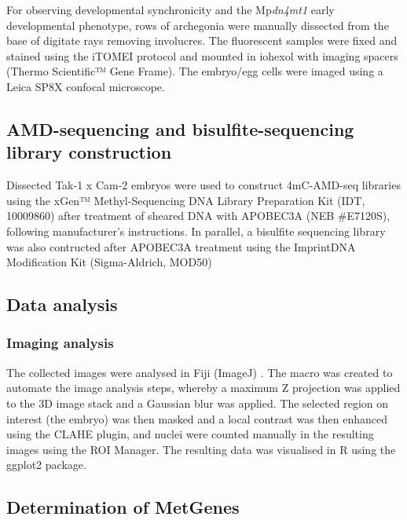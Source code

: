 For observing developmental synchronicity and the Mp\textit{dn4mt1} early developmental phenotype,  rows of archegonia were manually dissected from the base of digitate rays removing involucres. The fluorescent samples were fixed and stained using the iTOMEI protocol \citep{RN148} and mounted in iohexol with imaging spacers (Thermo Scientific™ Gene Frame). The embryo/egg cells were imaged using a Leica SP8X confocal microscope.

\subsection{AMD-sequencing and bisulfite-sequencing library construction}

Dissected Tak-1 x Cam-2 embryos were used to construct 4mC-AMD-seq libraries using the xGen™ Methyl-Sequencing DNA Library Preparation Kit (IDT, 10009860) after treatment of sheared DNA with APOBEC3A (NEB \#E7120S), following manufacturer’s instructions. In parallel, a bisulfite sequencing library was also contructed after APOBEC3A treatment using the Imprint\textregistered DNA Modification Kit (Sigma-Aldrich, MOD50)


\subsection{Data analysis}

\subsubsection{Imaging analysis}

The collected images were analysed in Fiji (ImageJ) \citep{RN267}. The macro was created to automate the image analysis steps, whereby a maximum Z projection was applied to the 3D image stack and a Gaussian blur was applied. The selected region on interest (the embryo) was then masked and a local contrast was then enhanced using the CLAHE plugin, and nuclei were counted manually in the resulting images using the ROI Manager. The resulting data was visualised in R using the ggplot2 package.

\subsection{Determination of MetGenes}

